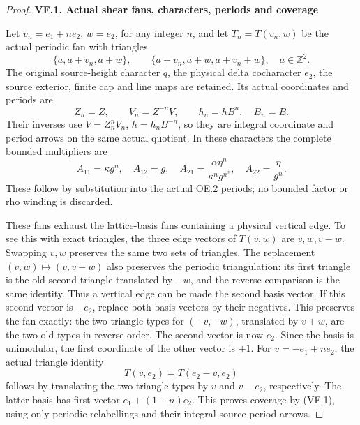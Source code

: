 \begin{proof}
\par

\medskip\noindent\textbf{VF.1. Actual shear fans, characters, periods and coverage}

\par\nobreak

Let \(v_n=e_1+ne_2\), \(w=e_2\), for any integer \(n\), and let
\(T_n=T(v_n,w)\) be the actual periodic fan with triangles
\[
 \{a,a+v_n,a+w\},\qquad
 \{a+v_n,a+w,a+v_n+w\},\quad a\in\mathbb Z^2.
                                                               \tag{VF.1}
\]
The original source-height character \(q\), the physical delta
cocharacter \(e_2\), the source exterior, finite cap and line maps
are retained. Its actual coordinates and periods are
\[
 Z_n=Z,\qquad V_n=Z^{-n}V,\qquad h_n=hB^n,\quad B_n=B.
                                                               \tag{VF.2}
\]
Their inverses use \(V=Z_n^nV_n\), \(h=h_nB^{-n}\), so they
are integral coordinate and period arrows on the same actual
quotient. In these characters the complete bounded multipliers are
\[
 A_{11}=\kappa g^n,\quad A_{12}=g,\quad
 A_{21}=\frac{\alpha\eta^n}{\kappa^n g^{n^2}},\quad
 A_{22}=\frac{\eta}{g^n}.                              \tag{VF.3}
\]
These follow by substitution into the actual OE.2 periods; no
bounded factor or rho winding is discarded.

These fans exhaust the lattice-basis fans containing a physical
vertical edge. To see this with exact triangles, the three edge
vectors of \(T(v,w)\) are \(v,w,v-w\). Swapping \(v,w\) preserves
the same two sets of triangles. The replacement
\((v,w)\mapsto(v,v-w)\) also preserves the periodic triangulation:
its first triangle is the old second triangle translated by \(-w\),
and the reverse comparison is the same identity. Thus a vertical
edge can be made the second basis vector. If this second vector is \(-e_2\), replace both basis vectors by
their negatives. This preserves the fan exactly: the two triangle
types for \((-v,-w)\), translated by \(v+w\), are the two
old types in reverse order. The second vector is now \(e_2\). Since the basis is unimodular, the first coordinate of
the other vector is \(\pm1\). For \(v=-e_1+ne_2\), the actual
triangle identity
\[
                         T(v,e_2)=T(e_2-v,e_2)
\]
follows by translating the two triangle types by \(v\) and
\(v-e_2\), respectively. The latter basis has first vector
\(e_1+(1-n)e_2\). This proves coverage by (VF.1), using only
periodic relabellings and their integral source-period arrows.


\end{proof}
